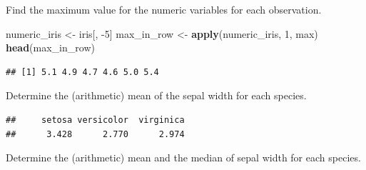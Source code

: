 \documentclass[
]{book}
\newenvironment{Shaded}{\begin{snugshade}}{\end{snugshade}}
\newcommand{\ControlFlowTok}[1]{\textcolor[rgb]{0.13,0.29,0.53}{\textbf{#1}}}
\newcommand{\DataTypeTok}[1]{\textcolor[rgb]{0.13,0.29,0.53}{#1}}
\newcommand{\DecValTok}[1]{\textcolor[rgb]{0.00,0.00,0.81}{#1}}
\newcommand{\KeywordTok}[1]{\textcolor[rgb]{0.13,0.29,0.53}{\textbf{#1}}}
\newcommand{\NormalTok}[1]{#1}
\newcommand{\OperatorTok}[1]{\textcolor[rgb]{0.81,0.36,0.00}{\textbf{#1}}}
\newcommand{\StringTok}[1]{\textcolor[rgb]{0.31,0.60,0.02}{#1}}
\begin{document}
Find the maximum value for the numeric variables for each observation.

\begin{Shaded}
\begin{Highlighting}[]
\NormalTok{numeric_iris <-}\StringTok{ }\NormalTok{iris[, }\DecValTok{-5}\NormalTok{]}
\NormalTok{max_in_row <-}\StringTok{ }\KeywordTok{apply}\NormalTok{(numeric_iris, }\DecValTok{1}\NormalTok{, max)}
\KeywordTok{head}\NormalTok{(max_in_row)}
\end{Highlighting}
\end{Shaded}

\begin{verbatim}
## [1] 5.1 4.9 4.7 4.6 5.0 5.4
\end{verbatim}

Determine the (arithmetic) mean of the sepal width for each species.

\begin{Shaded}
\end{Shaded}

\begin{verbatim}
##     setosa versicolor  virginica 
##      3.428      2.770      2.974
\end{verbatim}

Determine the (arithmetic) mean and the median of sepal width for each species.

\begin{Shaded}
\end{Shaded}
\end{document}

